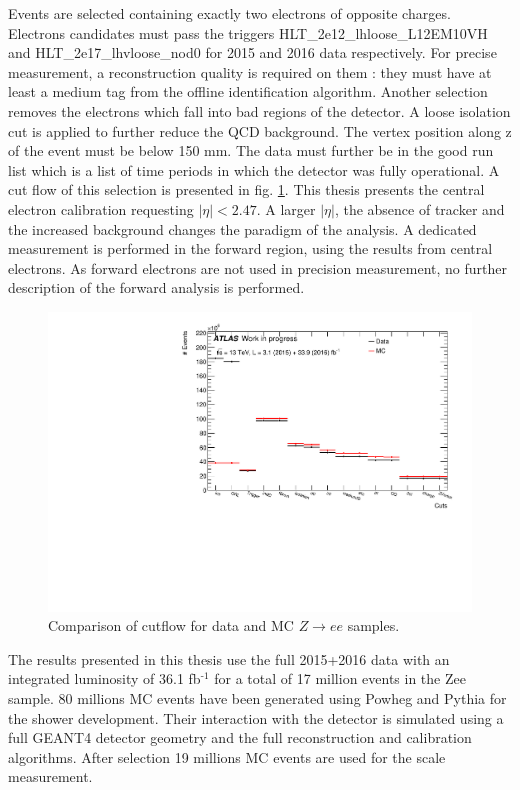 Events are selected containing exactly two electrons of opposite charges.
Electrons candidates must pass the triggers HLT\_2e12\_lhloose\_L12EM10VH and HLT\_2e17\_lhvloose\_nod0 for 2015 and 2016 data respectively.
For precise measurement, a reconstruction quality is required on them : they must have at least a medium tag from the offline identification algorithm.
Another selection removes the electrons which fall into bad regions of the detector.
A loose isolation cut is applied to further reduce the QCD background.
The vertex position along z of the event must be below 150 mm.
The data must further be in the good run list which is a list of  time periods in which the detector was fully operational.
A cut flow of this selection is presented in fig. \ref{fig:org0348ce0}.
This thesis presents the central electron calibration requesting $|\eta|<2.47$.
A larger $|\eta|$, the absence of tracker and the increased background changes the paradigm of the analysis.
A dedicated measurement is performed in the forward region, using the results from central electrons.
As forward electrons are not used in precision measurement, no further description of the forward analysis is performed.

\begin{figure}[htbp]
\centering
\includegraphics[width=0.9\linewidth]{Figures/cutFlow.pdf}
\caption{\label{fig:org0348ce0}
Comparison of cutflow for data and MC $Z\rightarrow ee$ samples.}
\end{figure}

The results presented in this thesis use the full 2015+2016 data with an integrated luminosity of 36.1 fb\(^{\text{-1}}\) for a total of 17 million events in the Zee sample.
80 millions MC events have been generated using Powheg and Pythia for the shower development.
Their interaction with the detector is simulated using a full GEANT4 \cite{GEANT4} detector geometry and the full reconstruction and calibration algorithms.
After selection 19 millions MC events are used for the scale measurement.


